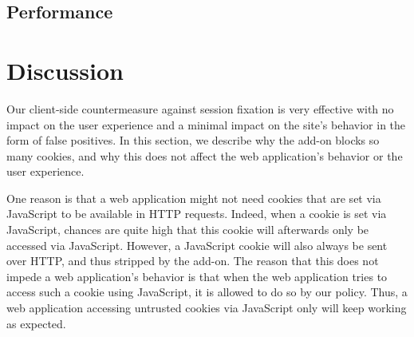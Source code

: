 \subsection{Performance}\label{performance}

\section{Discussion}\label{discussion}

Our client-side countermeasure against session fixation is very effective with no impact on the user experience and a minimal impact on the site’s behavior in the form of false positives. In this section, we describe why the add-on blocks so many cookies, and why this does not affect the web application's behavior or the user experience.

One reason is that a web application might not need cookies that are set via JavaScript to be available in HTTP requests. Indeed, when a cookie is set via JavaScript, chances are quite high that this cookie will afterwards only be accessed via JavaScript.  However, a JavaScript cookie will also always be sent over HTTP, and thus stripped by the add-on. The reason that this does not impede a web application's behavior is that when the web application tries to access such a cookie using JavaScript, it is allowed to do so by our policy. Thus, a web application accessing untrusted cookies via JavaScript only will keep working as expected.

